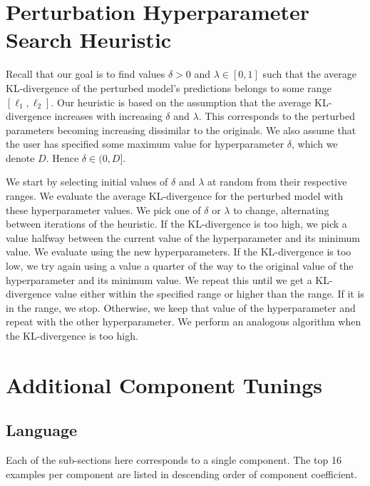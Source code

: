 \documentclass[dvipsnames]{article}
\begin{document}


\section{Perturbation Hyperparameter Search Heuristic}\label{sec:hyperparameter_heuristic}
Recall that our goal is to find values $\delta > 0$ and $\lambda \in [0, 1]$ such that the average KL-divergence of the perturbed model's predictions belongs to some range $[\ell_1, \ell_2]$.
Our heuristic is based on the assumption that the average KL-divergence increases with increasing $\delta$ and $\lambda$.
This corresponds to the perturbed parameters becoming increasing dissimilar to the originals.
We also assume that the user has specified some maximum value for hyperparameter $\delta$, which we denote $D$.
Hence $\delta \in (0, D]$.

We start by selecting initial values of $\delta$ and $\lambda$ at random from their respective ranges.
We evaluate the average KL-divergence for the perturbed model with these hyperparameter values.
We pick one of $\delta$ or $\lambda$ to change, alternating between iterations of the heuristic.
If the KL-divergence is too high, we pick a value halfway between the current value of the hyperparameter and its minimum value.
We evaluate using the new hyperparameters.
If the KL-divergence is too low, we try again using a value a quarter of the way to the original value of the hyperparameter and its minimum value.
We repeat this until we get a KL-divergence value either within the specified range or higher than the range.
If it is in the range, we stop.
Otherwise, we keep that value of the hyperparameter and repeat with the other hyperparameter.
We perform an analogous algorithm when the KL-divergence is too high.

\section{Additional Component Tunings}\label{sec:additional_tunings}

\subsection{Language}
Each of the sub-sections here corresponds to a single component.
The top 16 examples per component are listed in descending order of component coefficient.
\end{document}
